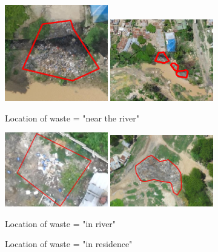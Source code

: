 \documentclass[a4paper,12pt,twoside]{article}
\begin{document}
\begin{enumerate}
               \begin{figure} %
                    \centering
                    \includegraphics[width=0.4\textwidth]{images/image17.png}
                    \includegraphics[width=0.4\textwidth]{images/image7.png}
                    \caption{Location of waste = "near the river"}
                \end{figure}
                
                \begin{figure} %
                    \centering
                    \includegraphics[width=0.4\textwidth]{images/image2.png}
                    \includegraphics[width=0.4\textwidth]{images/image12.png}
                    \caption{Location of waste = "in river"}
                    \caption{Location of waste = "in residence"}
                \end{figure}
                
        \end{enumerate}
        
\end{document}
